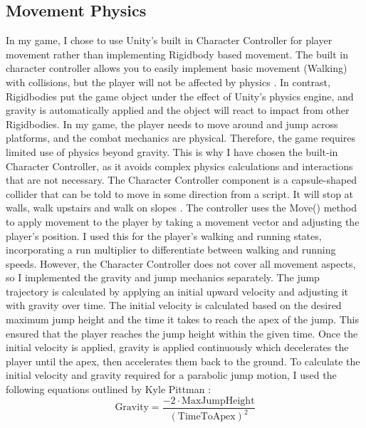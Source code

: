 \documentclass[10pt]{final_report}
\begin{document}
\subsection{Movement Physics}\label{physics}
In my game, I chose to use Unity's built in Character Controller for player movement rather than implementing Rigidbody based movement. The built in character controller allows you to easily implement basic movement (Walking) with collisions, but the player will not be affected by physics \cite{unity2024_charactercontroller}. In contrast, Rigidbodies put the game object under the effect of Unity's physics engine, and gravity is automatically applied and the object will react to impact from other Rigidbodies. In my game, the player needs to move around and jump across platforms, and the combat mechanics are physical. Therefore, the game requires limited use of physics beyond gravity.  This is why I have chosen the built-in Character Controller, as it avoids complex physics calculations and interactions that are not necessary. \newline
The Character Controller component is a capsule-shaped collider that can be told to move in some direction from a script. It will stop at walls, walk upstairs and walk on slopes \cite{unity2024_charactercontroller_reference}. The controller uses the Move() method to apply movement to the player by taking a movement vector and adjusting the player's position. I used this for the player's walking and running states, incorporating a run multiplier to differentiate between walking and running speeds. However, the Character Controller does not cover all movement aspects, so I implemented the gravity and jump mechanics separately.  \newline
The jump trajectory is calculated by applying an initial upward velocity and adjusting it with gravity over time. The initial velocity is calculated based on the desired maximum jump height and the time it takes to reach the apex of the jump. This ensured that the player reaches the jump height within the given time. Once the initial velocity is applied, gravity is applied continuously which decelerates the player until the apex, then accelerates them back to the ground. To calculate the initial velocity and gravity required for a parabolic jump motion, I used the following equations outlined by Kyle Pittman \cite{pittman2016_jump}:
\begin{equation}
\text{Gravity} = \frac{-2 \cdot \text{MaxJumpHeight}}{(\text{TimeToApex})^2}
\end{equation}
\end{document}
